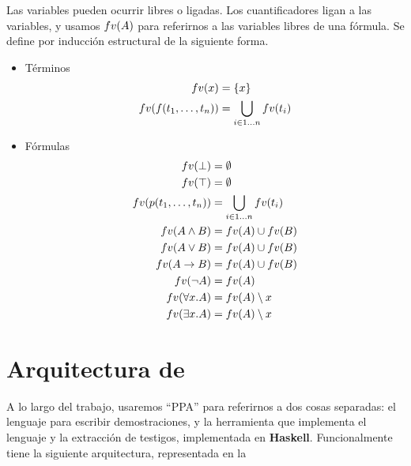\begin{definition}
    Las variables pueden ocurrir libres o ligadas. Los cuantificadores ligan a
    las variables, y usamos $fv(A)$ para referirnos a las variables libres
    de una fórmula. Se define por inducción estructural de la siguiente forma.

    \begin{itemize}
        \item Términos
        \begin{align*}
            fv(x) &= \{ x \}\\
            fv(f(t_1, \dots, t_n)) &= \bigcup_{i \in 1\dots n} fv(t_i) 
        \end{align*}
    
        \item Fórmulas
        \begin{align*}
            fv(\bot) &=\emptyset\\
            fv(\top) &=\emptyset \\
            fv(p(t_1, \dots, t_n)) &= \bigcup_{i \in 1\dots n} fv(t_i) \\
            fv(A \wedge B) &= fv(A) \cup fv(B)\\
            fv(A \vee B) &=fv(A) \cup fv(B)\\
            fv(A \to B) &=fv(A) \cup fv(B)\\
            fv(\neg A) &=fv(A)\\
            fv(\forall x . A) &= fv(A) \setminus x \\
            fv(\exists x . A) &= fv(A) \setminus x
        \end{align*}
    \end{itemize}
\end{definition}


\section{Arquitectura de \ppaTool{}}

A lo largo del trabajo, usaremos ``PPA'' para referirnos a dos cosas separadas: \ppaLang{} el lenguaje para escribir demostraciones, y \ppaTool{} la herramienta que implementa el lenguaje y la extracción de testigos,  implementada en \textbf{Haskell}. Funcionalmente tiene la siguiente arquitectura, representada en la 


